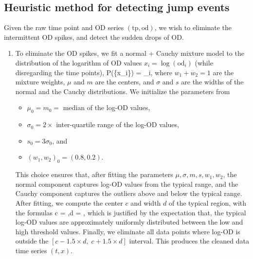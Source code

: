 \subsection{Heuristic method for detecting jump events}
\label{app:heuristic_method}
Given the raw time point and OD series $(\text{tp}, \text{od})$, we wish to eliminate the intermittent OD spikes, and detect the sudden drops of OD.

\begin{enumerate}
	\item To eliminate the OD spikes, we fit a normal + Cauchy mixture model to the distribution of the logarithm of OD values $x_i = \log(\text{od}_i)$ (while disregarding the time points),
	\be
		P(\{x_i\}) = \prod_{i},
	\ee
	where $w_1 + w_2 = 1$ are the mixture weights, $\mu$ and $m$ are the centers, and $\sigma$ and $s$ are the widths of the normal and the Cauchy distributions. We initialize the parameters from
	\begin{itemize}
		\item $\mu_0 = m_0 = $ median of the log-OD values,
		\item $\sigma_0 = 2\times$ inter-quartile range of the log-OD values,
		\item $s_0 = 3\sigma_0$, and
		\item $(w_1, w_2)_0 = (0.8, 0.2)$.
	\end{itemize}
	This choice ensures that, after fitting the parameters $\mu, \sigma, m, s, w_1, w_2$, the normal component captures log-OD values from the typical range, and the Cauchy component captures the outliers above and below the typical range.
	After fitting, we compute the center $c$ and width $d$ of the typical region, with the formulas
	\be
		c = \mu,\qquad d =  \times \sigma,
	\ee
	which is justified by the expectation that, the typical log-OD values are approximately uniformly distributed between the low and high threshold values. Finally, we eliminate all data points where log-OD is outside the $[c - 1.5 \times d, \; c + 1.5 \times d]$ interval. This produces the cleaned data time series $(t, x)$.


\end{enumerate}

